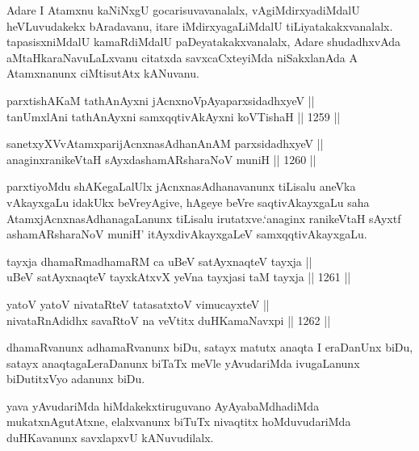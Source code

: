 \begin{artha}
Adare I Atamxnu kaNiNxgU gocarisuvavanalalx, vAgiMdirxyadiMdalU heVLuvudakekx bAradavanu, itare iMdirxyagaLiMdalU tiLiyatakakxvanalalx. tapasisxniMdalU kamaRdiMdalU paDeyatakakxvanalalx, Adare shudadhxvAda aMtaHkaraNavuLaLxvanu citatxda savxcaCxteyiMda niSakxlanAda A Atamxnanunx ciMtisutAtx kANuvanu.
\end{artha}

\begin{shl}
parxtishAKaM tathA\s nAyxni jAcnxnoVpAyaparxsidadhxyeV || \\
tanUmxlAni tathA\s nAyxni samxqqtivAkAyxni koVTishaH \hfill || 1259 ||  
\end{shl}
				
\begin{shl}
sanetxyXVvA\s \s tamxparijAcnxnasAdhanAnAM parxsidadhxyeV || \\
anaginxranikeVtaH sAyxdashamAR\s sharaNoV muniH \hfill || 1260 ||  
\end{shl}

\begin{artha}
parxtiyoMdu shAKegaLalUlx jAcnxnasAdhanavanunx tiLisalu aneVka vAkayxgaLu idakUkx beVreyAgive, hAgeye beVre saqtivAkayxgaLu saha AtamxjAcnxnasAdhanagaLanunx tiLisalu irutatxve.`anaginx ranikeVtaH sAyxtf ashamAR\s sharaNoV muniH' itAyxdivAkayxgaLeV samxqqtivAkayxgaLu.
\end{artha}


\begin{shl}
tayxja dhamaRmadhamaRM ca uBeV satAyxnaqteV tayxja || \\
uBeV satAyxnaqteV tayxkAtxvX yeVna tayxjasi taM tayxja \hfill || 1261 ||  
\end{shl}
				
\begin{shl}
yatoV yatoV nivataRteV tatasatxtoV vimucayxteV || \\
nivataRnAdidhx savaRtoV na veVtitx duHKamaNavxpi \hfill || 1262 ||  
\end{shl}

\begin{artha}
dhamaRvanunx adhamaRvanunx biDu, satayx matutx anaqta I eraDanUnx biDu, satayx anaqtagaLeraDanunx biTaTx meVle yAvudariMda ivugaLanunx biDutitxVyo adanunx biDu.
\end{artha}

\begin{artha}
yava yAvudariMda hiMdakekxtiruguvano AyAyabaMdhadiMda mukatxnAgutAtxne, elalxvanunx biTuTx nivaqtitx hoMduvudariMda duHKavanunx savxlapxvU kANuvudilalx.
\end{artha}

